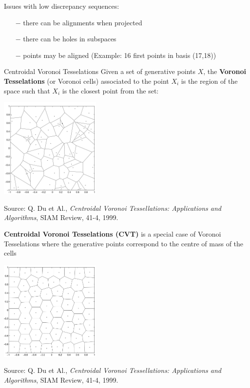 \documentclass{beamer}
\begin{document}
\begin{frame}{}
Issues with low discrepancy sequences:
\begin{itemize}
	\item[$-$] there can be alignments when projected
	\item[$-$] there can be holes in subspaces
	\item[$-$] points may be aligned (Example: 16 first points in basis (17,18))
\end{itemize}
\end{frame}

\begin{frame}{Centroidal Voronoi Tesselations}
Given a set of generative points $X$, the \textbf{Voronoi Tesselations} (or Voronoi cells) associated to the point $X_i$ is the region of the space such that $X_i$ is the closest point from the set:
\begin{center}
\includegraphics[height=5cm]{figures/VT}
\end{center}
Source: Q. Du et Al., \emph{Centroidal Voronoi Tessellations: Applications and Algorithms}, SIAM Review, 41-4, 1999.
\end{frame}

\begin{frame}{}
\textbf{Centroidal Voronoi Tesselations (CVT)} is a special case of Voronoi Tesselations where the generative points correspond to the centre of mass of the cells
\begin{center}
\includegraphics[height=5cm]{figures/CVT}
\end{center}
Source: Q. Du et Al., \emph{Centroidal Voronoi Tessellations: Applications and Algorithms}, SIAM Review, 41-4, 1999.
\end{frame}
\end{document}
